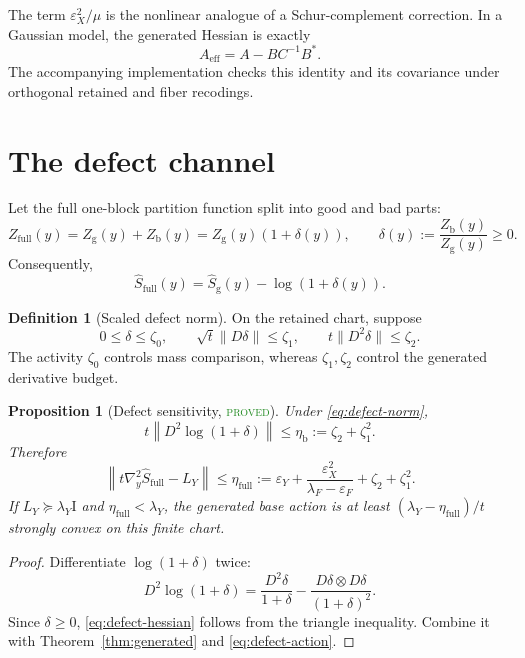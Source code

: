 \documentclass[11pt]{article}
\newtheorem{proposition}[theorem]{Proposition}
\theoremstyle{definition}
\newtheorem{definition}[theorem]{Definition}
\newcommand{\Id}{\mathrm I}
\newcommand{\good}{\mathrm g}
\newcommand{\bad}{\mathrm b}
\newcommand{\eff}{\mathrm{eff}}
\newcommand{\statusproved}{\textcolor{ForestGreen}{\textsc{proved}}}
\begin{document}
The term $\varepsilon_X^2/\mu$ is the nonlinear analogue of a Schur-complement
correction.  In a Gaussian model, the generated Hessian is exactly
\[
 A_{\eff}=A-BC^{-1}B^*.
\]
The accompanying implementation checks this identity and its covariance under
orthogonal retained and fiber recodings.

\section{The defect channel}

Let the full one-block partition function split into good and bad parts:
\[
 Z_{\mathrm{full}}(y)=Z_{\good}(y)+Z_{\bad}(y)
 =Z_{\good}(y)(1+\delta(y)),
 \qquad \delta(y):=\frac{Z_{\bad}(y)}{Z_{\good}(y)}\ge0.
\]
Consequently,
\begin{equation}\label{eq:defect-action}
 \widehat S_{\mathrm{full}}(y)
 =\widehat S_{\good}(y)-\log(1+\delta(y)).
\end{equation}

\begin{definition}[Scaled defect norm]
On the retained chart, suppose
\begin{equation}\label{eq:defect-norm}
 0\le\delta\le\zeta_0,
 \qquad \sqrt t\|D\delta\|\le\zeta_1,
 \qquad t\|D^2\delta\|\le\zeta_2.
\end{equation}
The activity $\zeta_0$ controls mass comparison, whereas
$\zeta_1,\zeta_2$ control the generated derivative budget.
\end{definition}

\begin{proposition}[Defect sensitivity, \statusproved]
\label{prop:defect}
Under \eqref{eq:defect-norm},
\begin{equation}\label{eq:defect-hessian}
 t\left\|D^2\log(1+\delta)\right\|
 \le \eta_{\bad}:=\zeta_2+\zeta_1^2.
\end{equation}
Therefore
\begin{equation}\label{eq:eta-full}
 \left\|t\nabla_y^2\widehat S_{\mathrm{full}}-L_Y\right\|
 \le
 \eta_{\mathrm{full}}:=
 \varepsilon_Y+
 \frac{\varepsilon_X^2}{\lambda_F-\varepsilon_F}
 +\zeta_2+\zeta_1^2.
\end{equation}
If $L_Y\succeq\lambda_Y\Id$ and
$\eta_{\mathrm{full}}<\lambda_Y$, the generated base action is at least
$(\lambda_Y-\eta_{\mathrm{full}})/t$ strongly convex on this finite chart.
\end{proposition}
\begin{proof}
Differentiate $\log(1+\delta)$ twice:
\[
 D^2\log(1+\delta)=\frac{D^2\delta}{1+\delta}
 -\frac{D\delta\otimes D\delta}{(1+\delta)^2}.
\]
Since $\delta\ge0$, \eqref{eq:defect-hessian} follows from the triangle
inequality.  Combine it with Theorem~\ref{thm:generated} and
\eqref{eq:defect-action}.
\end{proof}
\end{document}
